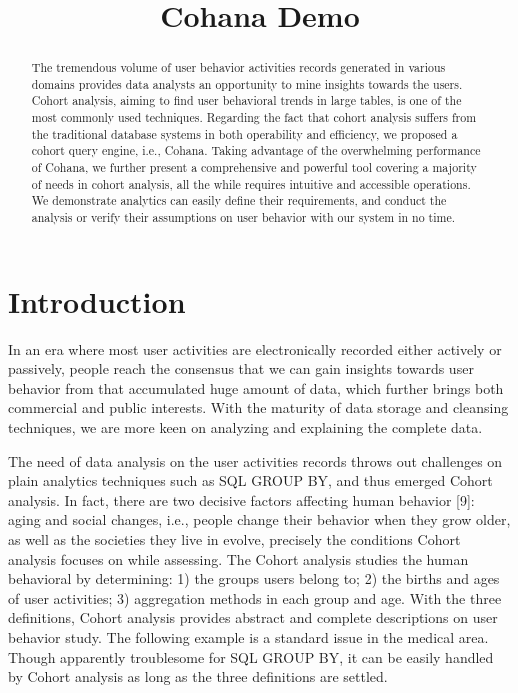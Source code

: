\documentclass[10pt,conference,letterpaper]{IEEEtran}
\title{Cohana Demo}
\begin{document}
\maketitle
%
\begin{abstract} 
The tremendous volume of user behavior activities records generated in various domains provides data analysts an opportunity to mine insights towards the users. Cohort analysis, aiming to find user behavioral trends in large tables, is one of the most commonly used techniques. Regarding the fact that cohort analysis suffers from the traditional database systems in both operability and efficiency, we proposed a cohort query engine, i.e., Cohana. Taking advantage of the overwhelming performance of Cohana, we further present a comprehensive and powerful tool covering a majority of needs in cohort analysis, all the while requires intuitive and accessible operations. We demonstrate analytics can easily define their requirements, and conduct the analysis or verify their assumptions on user behavior with our system in no time.
\end{abstract}

%
\section{Introduction}
%
In an era where most user activities are electronically recorded either actively or passively, people reach the consensus that we can gain insights towards user behavior from that accumulated huge amount of data, which further brings both commercial and public interests. With the maturity of data storage and cleansing techniques, we are more keen on analyzing and explaining the complete data.

The need of data analysis on the user activities records throws out challenges on plain analytics techniques such as SQL GROUP BY, and thus emerged Cohort analysis. In fact, there are two decisive factors affecting human behavior [9]: aging and social changes, i.e., people change their behavior when they grow older, as well as the societies they live in evolve, precisely the conditions Cohort analysis focuses on while assessing. The Cohort analysis studies the human behavioral by determining: 1) the groups users belong to; 2) the births and ages of user activities; 3) aggregation methods in each group and age. With the three definitions, Cohort analysis provides abstract and complete descriptions on user behavior study. The following example is a standard issue in the medical area. Though apparently troublesome for SQL GROUP BY, it can be easily handled by Cohort analysis as long as the three definitions are settled.
\end{document}
